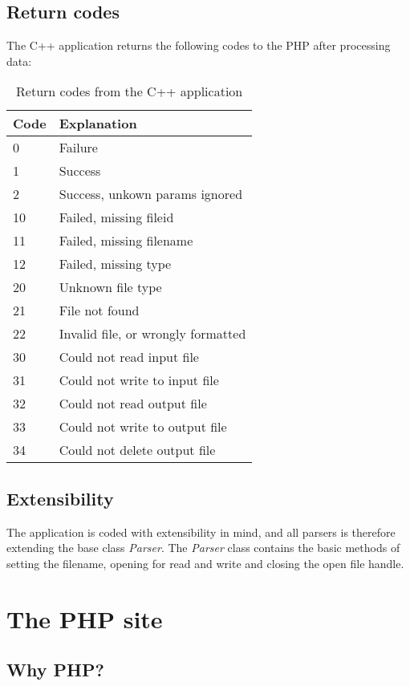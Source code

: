 \subsection{Return codes}
The C++ application returns the following codes to the PHP after processing data:
\begin{table}[htbp]
\centering
\begin{tabular}{|l|l|}
\hline
\textbf{Code} & \textbf{Explanation}\\
\hline
0 & Failure\\
\hline
1 & Success\\
\hline
2 & Success, unkown params ignored\\
\hline
10 & Failed, missing fileid\\
\hline
11 & Failed, missing filename\\
\hline
12 & Failed, missing type\\
\hline
20 & Unknown file type\\
\hline
21 & File not found\\
\hline
22 & Invalid file, or wrongly formatted\\
\hline
30 & Could not read input file\\
\hline
31 & Could not write to input file\\
\hline
32 & Could not read output file\\
\hline
33 & Could not write to output file\\
\hline
34 & Could not delete output file\\
\hline
\end{tabular}
\label{tab:cppReturnCodes}
\caption{Return codes from the C++ application}
\end{table}

\subsection{Extensibility}
The application is coded with extensibility in mind, and all parsers is therefore extending the base class \emph{Parser}.
The \emph{Parser} class contains the basic methods of setting the filename, opening for read and write and closing the open file handle.

\section{The PHP site}
\subsection{Why PHP?}

